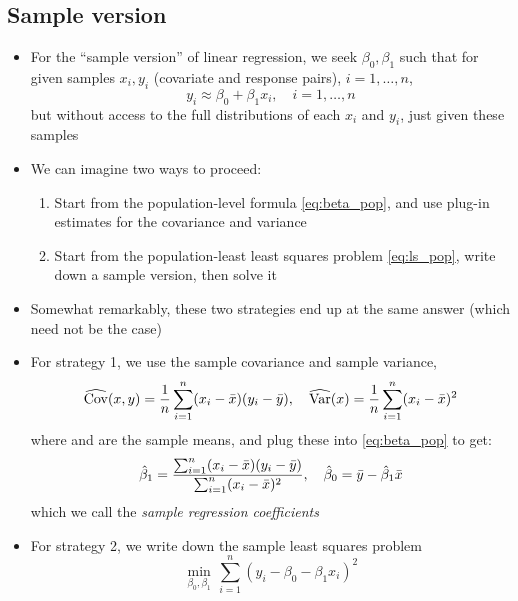 \documentclass{article}
\begin{document}
\subsection{Sample version}

\begin{itemize}
\item For the ``sample version'' of linear regression, we seek $\beta_0,\beta_1$
  such that for given samples $x_i,y_i$ (covariate and response pairs), $i =
  1,\dots,n$,  
  \[
  y_i \approx \beta_0 + \beta_1 x_i, \quad i = 1,\dots,n
  \]
  but without access to the full distributions of each $x_i$ and $y_i$, just
  given these samples

\item We can imagine two ways to proceed:
  \begin{enumerate}
  \item Start from the population-level formula \eqref{eq:beta_pop}, and use 
    plug-in estimates for the covariance and variance
\item Start from the population-least least squares problem \eqref{eq:ls_pop},
  write down a sample version, then solve it
  \end{enumerate}

\item Somewhat remarkably, these two strategies end up at the same answer
  (which need not be the case)

\item For strategy 1, we use the sample covariance and sample variance, 
  \[
  \widehat{\operatorname{Cov}}(x,y) = \frac{1}{n} \sum_{i=1}^n (x_i - \bar{x}) (y_i -
  \bar{y}), \quad
  \widehat{\operatorname{Var}}(x) = \frac{1}{n} \sum_{i=1}^n (x_i - \bar{x})^2
  \]
  where  and  are the sample means, and plug these into
  \eqref{eq:beta_pop} to get:  
  \begin{equation}
  \label{eq:beta}
  \hat{\beta}_1 = \frac{\sum_{i=1}^n (x_i - \bar{x}) (y_i - \bar{y})} 
  {\sum_{i=1}^n (x_i - \bar{x})^2}, \quad 
  \hat{\beta}_0 = \bar{y} - \hat{\beta}_1 \bar{x}
  \end{equation}
  which we call the \emph{sample regression coefficients}

\item For strategy 2, we write down the sample least squares problem   
  \begin{equation}
  \label{eq:ls}
  \min_{\beta_0, \beta_1} \, \sum_{i=1}^n (y_i - \beta_0 - \beta_1 x_i)^2 
  \end{equation}
  

\end{itemize}
\end{document}
